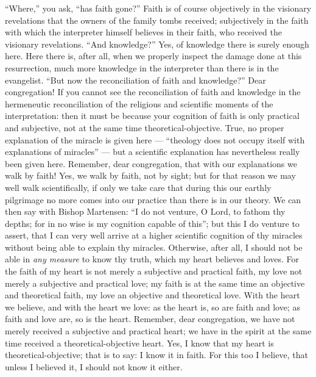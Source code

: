 \documentclass[12pt]{book}
\newcommand{\opage}[1]{\marginnote{\footnotesize\textit{[#1]}}}
\begin{document}
``Where,'' you ask, ``has faith gone?'' Faith is
\opage{51}\setcounter{footnote}{0}%
of course objectively in the visionary revelations that the owners of the family tombs received; subjectively in the faith with which the interpreter himself believes in their faith, who received the visionary revelations. ``And knowledge?'' Yes, of knowledge there is surely enough here. Here there is, after all, when we properly inspect the damage done at this resurrection, much more knowledge in the interpreter than there is in the evangelist. ``But now the reconciliation of faith and knowledge?'' Dear congregation! If you cannot see the reconciliation of faith and knowledge in the hermeneutic reconciliation of the religious and scientific moments of the interpretation: then it must be because your cognition of faith is only practical and subjective, not at the same time theoretical-objective. True, no proper explanation of the miracle is given here --- ``theology does not occupy itself with explanations of miracles'' --- but a scientific explanation has nevertheless really been given here. Remember, dear congregation, that with our explanations we walk by faith! Yes, we walk by faith, not by sight; but for that reason we may well walk scientifically, if only we take care that during this our earthly pilgrimage no more comes into our practice than there is in our theory. We can then say with Bishop Martensen: ``I do not venture, O Lord, to fathom thy depths; for in no wise is my cognition capable of this''; but this I do venture to assert, that I can very well arrive at a higher scientific cognition of thy miracles without being able to explain thy miracles. Otherwise, after all, I should not be able in \emph{any measure} to know thy truth, which my heart believes and loves. For the faith of my heart is not merely a subjective and practical faith, my love not merely a subjective and practical love; my faith is at the same time an objective and theoretical faith, my love an objective and theoretical love. With the heart we believe, and with the heart we love: as the heart is, so are faith and love; as faith and love are, so is the heart. Remember, dear congregation, we have not merely received a subjective and
\opage{52}\setcounter{footnote}{0}%
practical heart; we have in the spirit at the same time received a theoretical-objective heart. Yes, I know that my heart is theoretical-objective; that is to say: I know it in faith. For this too I believe, that unless I believed it, I should not know it either.
\end{document}
